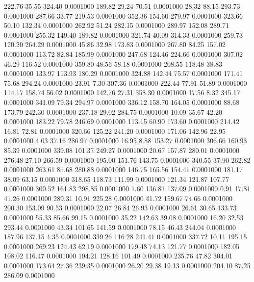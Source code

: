  222.76   35.55  324.40   0.0001000
 189.82   29.24   70.51   0.0001000
  28.32   88.15  293.73   0.0001000
 287.66   33.77  219.53   0.0001000
 352.36  154.60  279.97   0.0001000
 323.66   50.10  132.34   0.0001000
 262.92   51.24  282.15   0.0001000
 289.97  152.08  289.71   0.0001000
 255.32  149.40  189.82   0.0001000
 321.74   40.09  314.33   0.0001000
 259.73  120.20  264.29   0.0001000
  45.86   32.98  173.83   0.0001000
 267.80   84.25  157.02   0.0001000
 113.72   82.84  185.99   0.0001000
 247.68  124.46  224.66   0.0001000
 307.02   46.29  116.52   0.0001000
 359.80   48.56   58.18   0.0001000
 208.55  118.48   38.83   0.0001000
 133.97  113.93  180.29   0.0001000
 324.88  142.44   75.57   0.0001000
 171.41   75.68  294.24   0.0001000
  23.91    7.30  307.36   0.0001000
 222.44   77.91   51.89   0.0001000
 114.17  158.74   56.02   0.0001000
 142.76   27.31  358.30   0.0001000
  17.56    8.32  345.17   0.0001000
 341.09   79.34  294.97   0.0001000
 336.12  158.70  164.05   0.0001000
  88.68  173.79  242.30   0.0001000
 237.18   29.02  284.75   0.0001000
  10.09   35.67   42.20   0.0001000
 183.22   79.78  246.69   0.0001000
 113.15   60.90  173.60   0.0001000
 214.42   16.81   72.81   0.0001000
 320.66  125.22  241.20   0.0001000
 171.06  142.96   22.95   0.0001000
   4.03   37.16  286.97   0.0001000
  16.95    8.88  153.27   0.0001000
 306.66  160.93   85.39   0.0001000
 339.08  101.37  249.27   0.0001000
  20.67  157.87  280.01   0.0001000
 276.48   27.10  266.59   0.0001000
 195.00  151.76  143.75   0.0001000
 340.55   37.90  262.82   0.0001000
 263.61   81.68  280.88   0.0001000
 146.75  165.56  154.41   0.0001000
 181.17   38.09   63.15   0.0001000
 318.65  118.73  111.99   0.0001000
 121.34  121.87  107.77   0.0001000
 300.52  161.83  298.85   0.0001000
   1.60  136.81  137.09   0.0001000
   0.91   17.81   41.26   0.0001000
 289.31   10.91  225.28   0.0001000
  41.72  159.67   74.66   0.0001000
 200.30  153.09   90.53   0.0001000
  22.07   26.84   26.93   0.0001000
  26.61   30.65  133.73   0.0001000
  55.33   85.66   99.15   0.0001000
  35.22  142.63   39.08   0.0001000
  16.20   32.53  293.44   0.0001000
  43.34  101.65  141.59   0.0001000
  78.15   46.43  244.04   0.0001000
 187.96  137.15    4.35   0.0001000
 339.26  116.28  241.41   0.0001000
 337.72   10.11  195.15   0.0001000
 269.23  124.43   62.19   0.0001000
 179.48   74.13  121.77   0.0001000
 182.05  108.02  116.47   0.0001000
 194.21  128.16  101.49   0.0001000
 235.76   47.82  304.01   0.0001000
 173.64   27.36  239.35   0.0001000
  26.20   29.38   19.13   0.0001000
 204.10   87.25  286.09   0.0001000
